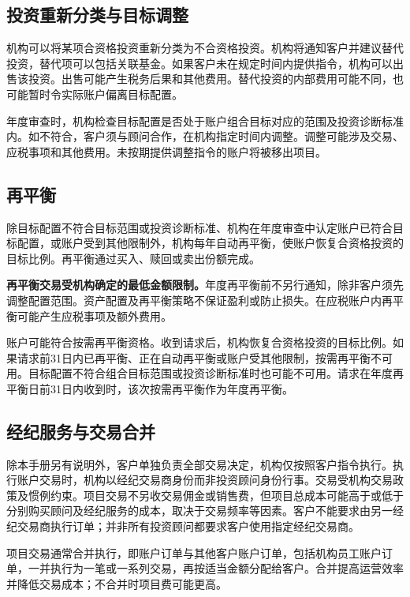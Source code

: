 \documentclass[UTF8,fontset=none,11pt,a4paper]{ctexart}
\begin{document}
\subsection*{投资重新分类与目标调整}
机构可以将某项合资格投资重新分类为不合资格投资。机构将通知客户并建议替代投资，替代项可以包括关联基金。如果客户未在规定时间内提供指令，机构可以出售该投资。出售可能产生税务后果和其他费用。替代投资的内部费用可能不同，也可能暂时令实际账户偏离\allowbreak\mbox{目标配置。}


年度审查时，机构检查目标配置是否处于账户组合目标对应的范围及投资诊断标准内。如不符合，客户须与顾问合作，在机构指定时间内调整。调整可能涉及交易、应税事项和其他费用。未按期提供调整指令的账户将被\allowbreak\mbox{移出项目。}


\subsection*{再平衡}
除目标配置不符合目标范围或投资诊断标准、机构在年度审查中认定账户已符合目标配置，或账户受到其他限制外，机构每年自动再平衡，使账户恢复合资格投资的目标比例。再平衡通过买入、赎回或卖出\allowbreak\mbox{份额完成。}


\textbf{再平衡交易受机构确定的最低金额限制。}年度再平衡前不另行通知，除非客户须先调整配置范围。资产配置及再平衡策略不保证盈利或防止损失。在应税账户内再平衡可能产生应税事项及\allowbreak\mbox{额外费用。}


账户可能符合按需再平衡资格。收到请求后，机构恢复合资格投资的目标比例。如果请求前31日内已再平衡、正在自动再平衡或账户受其他限制，按需再平衡不可用。目标配置不符合组合目标范围或投资诊断标准时也可能不可用。请求在年度再平衡日前31日内收到时，该次按需再平衡作为年\allowbreak\mbox{度再平衡。}


\subsection*{经纪服务与交易合并}
除本手册另有说明外，客户单独负责全部交易决定，机构仅按照客户指令执行。执行账户交易时，机构以经纪交易商身份而非投资顾问身份行事。交易受机构交易政策及惯例约束。项目交易不另收交易佣金或销售费，但项目总成本可能高于或低于分别购买顾问及经纪服务的成本，取决于交易频率等因素。客户不能要求由另一经纪交易商执行订单；并非所有投资顾问都要求客户使用指定经\allowbreak\mbox{纪交易商。}


项目交易通常合并执行，即账户订单与其他客户账户订单，包括机构员工账户订单，一并执行为一笔或一系列交易，再按适当金额分配给客户。合并提高运营效率并降低交易成本；不合并时项目费\allowbreak\mbox{可能更高。}
\end{document}
